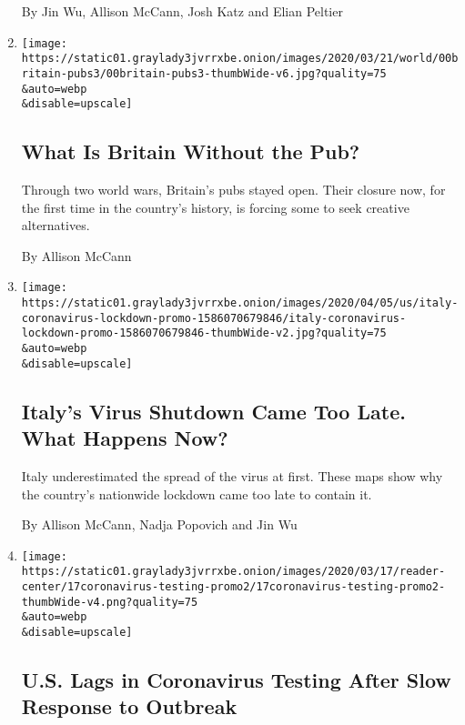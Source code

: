 \begin{enumerate}
  By Jin Wu, Allison McCann, Josh Katz and Elian Peltier
\item
  \href{/2020/04/09/world/europe/uk-pub-coronavirus.html}{}

  \texttt{[image: https://static01.graylady3jvrrxbe.onion/images/2020/03/21/world/00britain-pubs3/00britain-pubs3-thumbWide-v6.jpg?quality=75\\\&auto=webp\\\&disable=upscale]}

  \hypertarget{what-is-britain-without-the-pub}{%
  \subsection{What Is Britain Without the
  Pub?}\label{what-is-britain-without-the-pub}}

  Through two world wars, Britain's pubs stayed open. Their closure now,
  for the first time in the country's history, is forcing some to seek
  creative alternatives.

  By Allison McCann
\item
  \href{/interactive/2020/04/05/world/europe/italy-coronavirus-lockdown-reopen.html}{}

  \texttt{[image: https://static01.graylady3jvrrxbe.onion/images/2020/04/05/us/italy-coronavirus-lockdown-promo-1586070679846/italy-coronavirus-lockdown-promo-1586070679846-thumbWide-v2.jpg?quality=75\\\&auto=webp\\\&disable=upscale]}

  \hypertarget{italys-virus-shutdown-came-too-late-what-happens-now}{%
  \subsection{Italy's Virus Shutdown Came Too Late. What Happens
  Now?}\label{italys-virus-shutdown-came-too-late-what-happens-now}}

  Italy underestimated the spread of the virus at first. These maps show
  why the country's nationwide lockdown came too late to contain it.

  By Allison McCann, Nadja Popovich and Jin Wu
\item
  \href{/interactive/2020/03/17/us/coronavirus-testing-data.html}{}

  \texttt{[image: https://static01.graylady3jvrrxbe.onion/images/2020/03/17/reader-center/17coronavirus-testing-promo2/17coronavirus-testing-promo2-thumbWide-v4.png?quality=75\\\&auto=webp\\\&disable=upscale]}

  \hypertarget{us-lags-in-coronavirus-testing-after-slow-response-to-outbreak}{%
  \subsection{U.S. Lags in Coronavirus Testing After Slow Response to
  Outbreak}\label{us-lags-in-coronavirus-testing-after-slow-response-to-outbreak}}


\end{enumerate}
